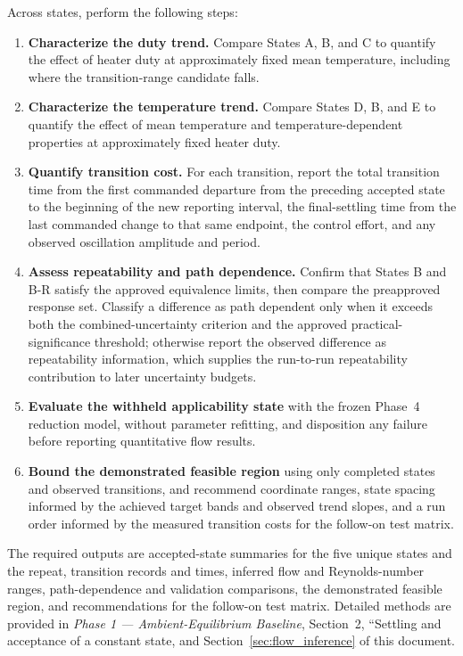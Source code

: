 \documentclass[11pt]{article}
\newcommand{\PhaseOneDoc}{\textit{Phase 1 --- Ambient-Equilibrium Baseline}}
\begin{document}
Across states, perform the following steps:

\begin{enumerate}
    \item \textbf{Characterize the duty trend.} Compare States A, B, and C to quantify the effect of heater duty at approximately fixed mean temperature, including where the transition-range candidate falls.

    \item \textbf{Characterize the temperature trend.} Compare States D, B, and E to quantify the effect of mean temperature and temperature-dependent properties at approximately fixed heater duty.

    \item \textbf{Quantify transition cost.} For each transition, report the total transition time from the first commanded departure from the preceding accepted state to the beginning of the new reporting interval, the final-settling time from the last commanded change to that same endpoint, the control effort, and any observed oscillation amplitude and period.

    \item \textbf{Assess repeatability and path dependence.} Confirm that States B and B-R satisfy the approved equivalence limits, then compare the preapproved response set. Classify a difference as path dependent only when it exceeds both the combined-uncertainty criterion and the approved practical-significance threshold; otherwise report the observed difference as repeatability information, which supplies the run-to-run repeatability contribution to later uncertainty budgets.

    \item \textbf{Evaluate the withheld applicability state} with the frozen Phase~4 reduction model, without parameter refitting, and disposition any failure before reporting quantitative flow results.

    \item \textbf{Bound the demonstrated feasible region} using only completed states and observed transitions, and recommend coordinate ranges, state spacing informed by the achieved target bands and observed trend slopes, and a run order informed by the measured transition costs for the follow-on test matrix.
\end{enumerate}

The required outputs are accepted-state summaries for the five unique states and the repeat, transition records and times, inferred flow and Reynolds-number ranges, path-dependence and validation comparisons, the demonstrated feasible region, and recommendations for the follow-on test matrix. Detailed methods are provided in \PhaseOneDoc, Section~2, ``Settling and acceptance of a constant state, and Section~\ref{sec:flow_inference} of this document.
\end{document}
